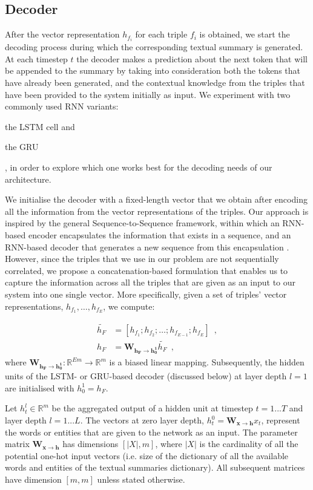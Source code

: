 \documentclass[preprint,5p]{elsarticle}
\begin{document}
\subsection{Decoder}
After the vector representation $h_{f_i}$ for each triple $f_i$ is obtained, we start the decoding process during which the corresponding textual summary is generated. At each timestep $t$ the decoder makes a prediction about the next token that will be appended to the summary by taking into consideration both the tokens that have already been generated, and the contextual knowledge from the triples that have been provided to the system initially as input. We experiment with two commonly used RNN variants:\begin{inparaenum}[(i)]\item the LSTM cell and \item the GRU\end{inparaenum}, in order to explore which one works best for the decoding needs of our architecture.

We initialise the decoder with a fixed-length vector that we obtain after encoding all the information from the vector representations of the triples. Our approach is inspired by the general Sequence-to-Sequence framework, within which an RNN-based encoder encapsulates the information that exists in a sequence, and an RNN-based decoder that generates a new sequence from this encapsulation \cite{Cho2014,Sutskever2014}. However, since the triples that we use in our problem are not sequentially correlated, we propose a concatenation-based formulation that enables us to capture the information across all the triples that are given as an input to our system into one single vector. More specifically, given a set of triples' vector representations, $h_{f_1}, \ldots, h_{f_E}$, we compute:

\begin{align}
  \widetilde{h_F} & = [h_{f_1}; h_{f_2}; \ldots; h_{f_{E-1}}; h_{f_E}] \enspace, \\
  h_F & = \mathbf{W_{h_F \rightarrow h_0^1}}\widetilde{h_F} \enspace,
\end{align}where $\mathbf{W_{h_F \rightarrow h_0^1}}:\mathbb{R}^{Em} \rightarrow \mathbb{R}^m$ is a biased linear mapping. Subsequently, the hidden units of the LSTM- or GRU-based decoder (discussed below) at layer depth $l=1$ are initialised with $h_0^1=h_F$.


Let $h_t^l \in \mathbb{R}^{m}$ be the aggregated output of a hidden unit at timestep $t=1... T$ and layer depth $l=1... L$. The vectors at zero layer depth, $h_t^0=\mathbf{W_{x \rightarrow h}}x_t$, represent the words or entities that are given to the network as an input. The parameter matrix $\mathbf{W_{x \rightarrow h}}$ has dimensions $[|X|, m]$, where $|X|$ is the cardinality of all the potential one-hot input vectors (i.e. size of the dictionary of all the available words and entities of the textual summaries dictionary). All subsequent matrices have dimension $[m, m]$ unless stated otherwise.
\end{document}
